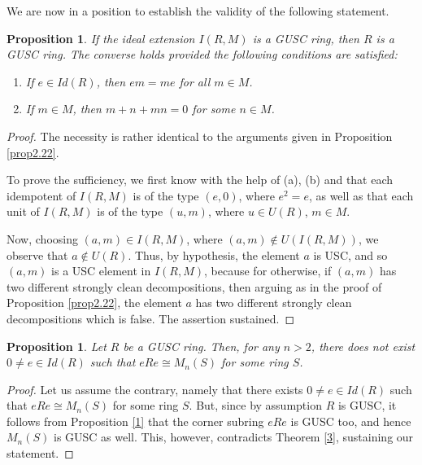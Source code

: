 \documentclass[12pt]{amsart}
\newtheorem{proposition}[theorem]{Proposition}
\theoremstyle{definition}
\begin{document}
\medskip

We are now in a position to establish the validity of the following statement.

\begin{proposition}\label{prop2.23}
If the ideal extension $I(R,M)$ is a GUSC ring, then $R$ is a GUSC ring. The converse holds provided the following conditions are satisfied:
\begin{enumerate}
\item[(a)]
If $e\in Id(R)$, then $em=me$ for all $m\in M$.
\item[(b)]
If $m\in M$, then $m+n+mn=0$ for some $n\in M$.
\end{enumerate}
\end{proposition}

\begin{proof}
The necessity is rather identical to the arguments given in Proposition \ref{prop2.22}.

To prove the sufficiency, we first know with the help of (a), (b) and \cite[Proposition7]{3} that each idempotent of $I(R,M)$ is of the type $(e,0)$, where $e^{2}=e$, as well as that each unit of $I(R,M)$ is of the type $(u,m)$, where $u\in U(R)$, $m\in M$.

Now, choosing $(a,m)\in I(R,M)$, where $(a,m)\not\in U(I(R,M))$, we observe that $a\not\in U(R)$. Thus, by hypothesis, the element $a$ is USC, and so $(a,m)$ is a USC element in $I(R,M)$, because for otherwise, if $(a,m)$ has two different strongly clean decompositions, then arguing as in the proof of Proposition \ref{prop2.22}, the element $a$ has two different strongly clean decompositions which is false. The assertion sustained.
\end{proof}

\begin{proposition}\label{2}
Let $R$ be a GUSC ring. Then, for any $n>2$, there does not exist $0\neq e\in Id(R)$ such that $eRe\cong M_{n}(S)$ for some ring $S$.
\end{proposition}

\begin{proof}
Let us assume the contrary, namely that there exists $0\neq e\in Id(R)$ such that $eRe\cong M_{n}(S)$ for some ring $S$. But, since by assumption $R$ is GUSC, it follows from Proposition \ref{1} that the corner subring $eRe$ is GUSC too, and hence $M_{n}(S)$ is GUSC as well. This, however, contradicts Theorem \ref{3}, sustaining our statement.
\end{proof}
\end{document}
